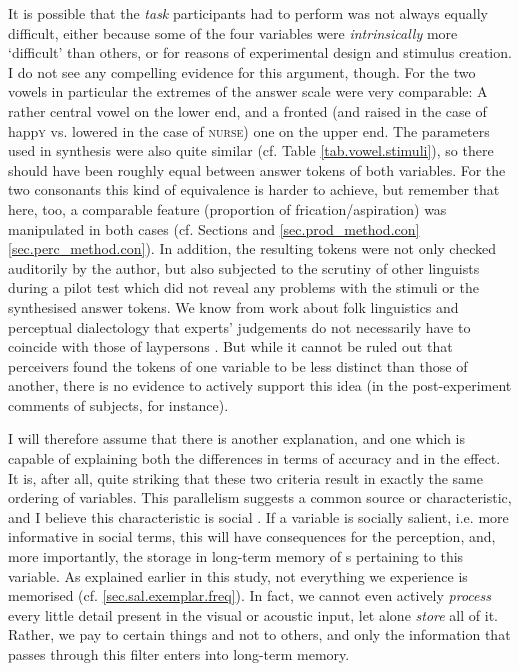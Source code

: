 It is possible that the \emph{task} participants had to perform was not always equally difficult, either because some of the four variables were \emph{intrinsically} more `difficult' than others, or for reasons of experimental design and stimulus creation.
I do not see any compelling evidence for this argument, though.
For the two vowels in particular the extremes of the answer scale were very comparable: A rather central vowel on the lower end, and a fronted (and raised in the case of happ\textsc{y} vs. lowered in the case of \textsc{nurse)} one on the upper end.
The parameters used in synthesis were also quite similar (cf. Table \ref{tab.vowel.stimuli}), so there should have been roughly equal  between answer tokens of both variables.
For the two consonants this kind of equivalence is harder to achieve, but remember that here, too, a comparable feature (proportion of frication/aspiration) was manipulated in both cases (cf. Sections and \ref{sec.prod_method.con} \ref{sec.perc_method.con}).
In addition, the resulting tokens were not only checked auditorily by the author, but also subjected to the scrutiny of other linguists during a pilot test which did not reveal any problems with the stimuli or the synthesised answer tokens.
We know from work about folk linguistics and perceptual dialectology that experts' judgements do not necessarily have to coincide with those of laypersons \parencite{preston1999,niedzielskipreston2000}.
But while it cannot be ruled out that perceivers found the tokens of one variable to be less distinct than those of another, there is no evidence to actively support this idea (in the post-experiment comments of subjects, for instance). 

I will therefore assume that there is another explanation, and one which is capable of explaining both the differences in terms of accuracy and in the  effect.
It is, after all, quite striking that these two criteria result in exactly the same ordering of variables.
This parallelism suggests a common source or characteristic, and I believe this characteristic is social .
If a variable is socially salient, i.e. more informative in social terms, this will have consequences for the perception, and, more importantly, the storage in long-term memory of s pertaining to this variable.
As explained earlier in this study, not everything we experience is memorised (cf. \ref{sec.sal.exemplar.freq}).
In fact, we cannot even actively \emph{process} every little detail present in the visual or acoustic input, let alone \emph{store} all of it.
Rather, we pay  to certain things and not to others, and only the information that passes through this filter enters into long-term memory.

